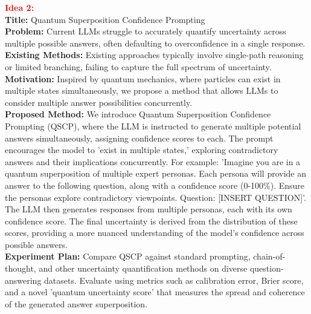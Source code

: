 \textbf{\textcolor{red}{Idea 2:}} \\
\textbf{Title:} Quantum Superposition Confidence Prompting \\
\textbf{Problem:} Current LLMs struggle to accurately quantify uncertainty across multiple possible answers, often defaulting to overconfidence in a single response. \\
\textbf{Existing Methods:} Existing approaches typically involve single-path reasoning or limited branching, failing to capture the full spectrum of uncertainty. \\
\textbf{Motivation:} Inspired by quantum mechanics, where particles can exist in multiple states simultaneously, we propose a method that allows LLMs to consider multiple answer possibilities concurrently. \\
\textbf{Proposed Method:} We introduce Quantum Superposition Confidence Prompting (QSCP), where the LLM is instructed to generate multiple potential answers simultaneously, assigning confidence scores to each. The prompt encourages the model to 'exist in multiple states,' exploring contradictory answers and their implications concurrently. For example: 'Imagine you are in a quantum superposition of multiple expert personas. Each persona will provide an answer to the following question, along with a confidence score (0-100\%). Ensure the personas explore contradictory viewpoints. Question: [INSERT QUESTION]'. The LLM then generates responses from multiple personas, each with its own confidence score. The final uncertainty is derived from the distribution of these scores, providing a more nuanced understanding of the model's confidence across possible answers. \\
\textbf{Experiment Plan:} Compare QSCP against standard prompting, chain-of-thought, and other uncertainty quantification methods on diverse question-answering datasets. Evaluate using metrics such as calibration error, Brier score, and a novel 'quantum uncertainty score' that measures the spread and coherence of the generated answer superposition.

\vspace{0.5em}

